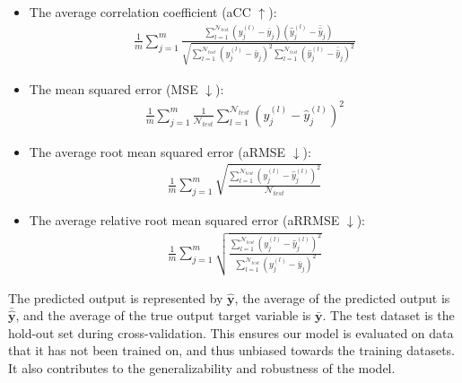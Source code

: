 \documentclass[reqno]{vcuthesis}
\numberwithin{equation}{chapter}
\begin{document}
\begin{itemize}
\item The average correlation coefficient (aCC $\uparrow$):
\begin{eqnarray}
\frac{1}{m} \sum_{j = 1}^m \frac{\sum_{l = 1}^{\mathcal N_{test}} (y_j^{(l)} - \bar{y}_j)(\hat{y}_j^{(l)} - \bar{\hat{y}}_j)}{\sqrt{\sum_{l = 1}^{\mathcal N_{test}} (y_j^{(l)} - \bar{y}_j)^2 \sum_{l = 1}^{\mathcal N_{test}} (\hat{y}_j^{(l)} - \bar{\hat{y}}_j)^2}}
\label{eqn:aCC}
\end{eqnarray}

\item The mean squared error (MSE $\downarrow$):
\begin{eqnarray}
\frac{1}{m} \sum_{j = 1}^m \frac{1}{\mathcal N_{test}} \sum_{l = 1}^{\mathcal N_{test}} (y_j^{(l)} - \hat{y}^{(l)}_j)^2
\label{eqn:MSE}
\end{eqnarray}

\item The average root mean squared error (aRMSE $\downarrow$):
\begin{eqnarray}
\frac{1}{m} \sum_{j = 1}^m \sqrt{\frac{\sum_{l = 1}^{\mathcal N_{test}} (y_j^{(l)} - \hat{y}^{(l)}_j)^2}{\mathcal N_{test}}}
\label{eqn:armse}
\end{eqnarray}

\item The average relative root mean squared error (aRRMSE $\downarrow$):
\begin{eqnarray}
\frac{1}{m} \sum_{j = 1}^m \sqrt{\frac{\sum_{l = 1}^{\mathcal N_{test}} (y_j^{(l)} - \hat{y}_j^{(l)})^2}{\sum_{l = 1}^{\mathcal N_{test}} (y_j^{(l)} - \bar{y}_j)^2}}
\label{eqn:arrmse}
\end{eqnarray}
\end{itemize}

The predicted output is represented by $\hat{\textbf{y}}$, the average of the predicted output is $\bar{\hat{\textbf{y}}}$, and the average of the true output target variable is $\bar{\textbf{y}}$. The test dataset is the hold-out set during cross-validation. This ensures our model is evaluated on data that it has not been trained on, and thus unbiased towards the training datasets. It also contributes to the generalizability and robustness of the model.
\end{document}
